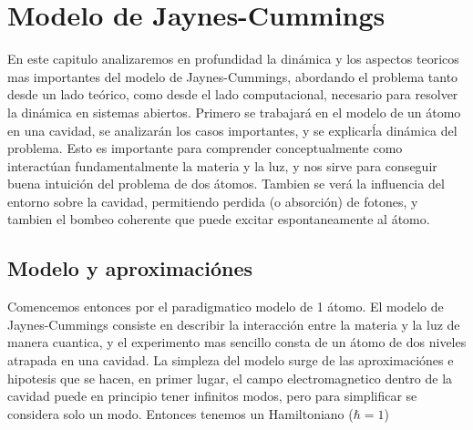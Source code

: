 \chapter{Modelo de Jaynes-Cummings}
\label{ch3_jcm}

\pagestyle{fancy}
\fancyhf{}
\fancyhead[LE]{\nouppercase{\rightmark\hfill}}
\fancyhead[RO]{\nouppercase{\leftmark\hfill}}
\fancyfoot[LE,RO]{\hfill\thepage\hfill}

En este capitulo analizaremos en profundidad la din\'amica y los aspectos teoricos mas importantes 
del modelo de Jaynes-Cummings, abordando el problema tanto desde un lado te\'orico, como desde
el lado computacional, necesario para resolver la din\'amica en sistemas abiertos.
Primero se trabajar\'a en el modelo de un átomo en una cavidad, se analizar\'an los casos importantes,
y se explicar\' la din\'amica del problema. Esto es importante para comprender conceptualmente como
interact\'uan fundamentalmente la materia y la luz, y nos sirve para conseguir buena intuici\'on del
problema de dos átomos. Tambien se ver\'a la influencia del entorno sobre la cavidad, permitiendo
perdida (o absorci\'on) de fotones, y tambien el bombeo coherente que puede excitar espontaneamente
al átomo. \newline

\section{Modelo y aproximaciónes}
Comencemos entonces por el paradigmatico modelo de 1 átomo. El modelo de Jaynes-Cummings consiste en describir la interacción entre la materia y la luz de manera cuantica, y el experimento mas sencillo consta de un átomo de dos niveles atrapada en una cavidad. La simpleza del modelo surge de las aproximaciónes e hipotesis que se hacen, en primer lugar, el campo electromagnetico dentro de la cavidad puede en principio tener infinitos modos, pero para simplificar se considera solo un modo. 
Entonces tenemos un Hamiltoniano ($\hbar = 1$)

